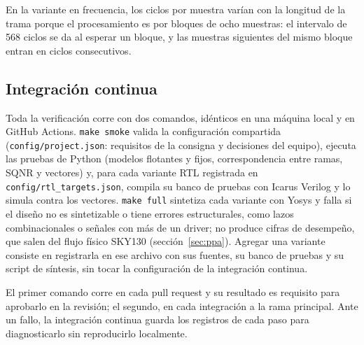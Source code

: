 En la variante en frecuencia, los ciclos por muestra varían con la longitud de la trama porque el procesamiento es por bloques de ocho muestras: el intervalo de 568 ciclos se da al esperar un bloque, y las muestras siguientes del mismo bloque entran en ciclos consecutivos.

\subsection{Integración continua}

Toda la verificación corre con dos comandos, idénticos en una máquina local y en GitHub Actions. \texttt{make smoke} valida la configuración compartida (\texttt{config/project.json}: requisitos de la consigna y decisiones del equipo), ejecuta las pruebas de Python (modelos flotantes y fijos, correspondencia entre ramas, SQNR y vectores) y, para cada variante RTL registrada en \texttt{config/rtl\_targets.json}, compila su banco de pruebas con Icarus Verilog y lo simula contra los vectores. \texttt{make full} sintetiza cada variante con Yosys y falla si el diseño no es sintetizable o tiene errores estructurales, como lazos combinacionales o señales con más de un driver; no produce cifras de desempeño, que salen del flujo físico SKY130 (sección~\ref{sec:ppa}). Agregar una variante consiste en registrarla en ese archivo con sus fuentes, su banco de pruebas y su script de síntesis, sin tocar la configuración de la integración continua.

El primer comando corre en cada pull request y su resultado es requisito para aprobarlo en la revisión; el segundo, en cada integración a la rama principal. Ante un fallo, la integración continua guarda los registros de cada paso para diagnosticarlo sin reproducirlo localmente.
